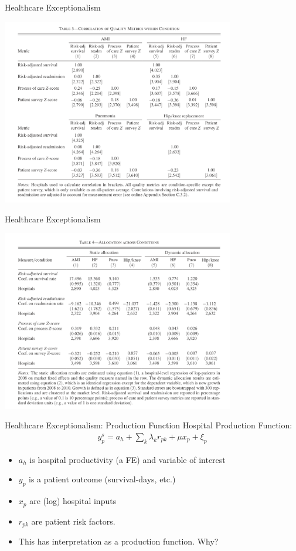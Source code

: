 \documentclass[xcolor=pdftex,dvipsnames,table,mathserif,aspectratio=169]{beamer}
\begin{document}
\begin{frame}{Healthcare Exceptionalism}
\begin{center}
\includegraphics[width=4in]{./resources/hc3.png}
\end{center}
\end{frame}

\begin{frame}{Healthcare Exceptionalism}
\begin{center}
\includegraphics[width=4in]{./resources/hc4.png}
\end{center}
\end{frame}


\begin{frame}{Healthcare Exceptionalism: Production Function}
Hospital Production Function:
\begin{align*}
y_{p}^{s}=a_{h}+\sum_{k} \lambda_{k} r_{p k}+\mu x_{p}+\xi_{p}
\end{align*}
\begin{itemize}
\item $a_h$ is \alert{hospital productivity} (a FE) and variable of interest
\item $y_p$ is a patient outcome (survival-days, etc.)
\item $x_p$ are (log) hospital inputs
\item $r_{pk}$ are patient risk factors.
\item This has interpretation as a \alert{production function}. Why?
\end{itemize}
\end{frame}
\end{document}
